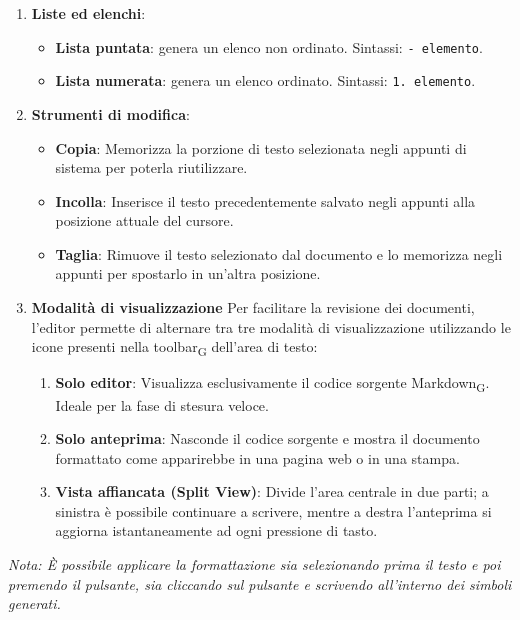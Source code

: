 \documentclass[11pt,a4paper]{article}
\newcommand{\gls}[1]{#1\textsubscript{G}}
\begin{document}
\begin{enumerate}
    \item \textbf{Liste ed elenchi}:
    \begin{itemize}
        \item \textbf{Lista puntata}: genera un elenco non ordinato. Sintassi: \texttt{- elemento}.
        \item \textbf{Lista numerata}: genera un elenco ordinato. Sintassi: \texttt{1. elemento}.
    \end{itemize}

    \item \textbf{Strumenti di modifica}:
    \begin{itemize}
        \item \textbf{Copia}: Memorizza la porzione di testo selezionata negli appunti di sistema per poterla riutilizzare.
        \item \textbf{Incolla}: Inserisce il testo precedentemente salvato negli appunti alla posizione attuale del cursore.
        \item \textbf{Taglia}: Rimuove il testo selezionato dal documento e lo memorizza negli appunti per spostarlo in un'altra posizione. 
    \end{itemize}

    \item \textbf{Modalità di visualizzazione}
    Per facilitare la revisione dei documenti, l'editor permette di alternare tra tre modalità di visualizzazione utilizzando le icone presenti nella \gls{toolbar} dell'area di testo:
    
    \begin{enumerate}
        \item \textbf{Solo editor}: Visualizza esclusivamente il codice sorgente \gls{Markdown}. Ideale per la fase di stesura veloce.
        \item \textbf{Solo anteprima}: Nasconde il codice sorgente e mostra il documento formattato come apparirebbe in una pagina web o in una stampa.
        \item \textbf{Vista affiancata (Split View)}: Divide l'area centrale in due parti; a sinistra è possibile continuare a scrivere, mentre a destra l'anteprima si aggiorna istantaneamente ad ogni pressione di tasto.
    \end{enumerate}
\end{enumerate}

\textit{Nota: È possibile applicare la formattazione sia selezionando prima il testo e poi premendo il pulsante, sia cliccando sul pulsante e scrivendo all'interno dei simboli generati.}
\end{document}
